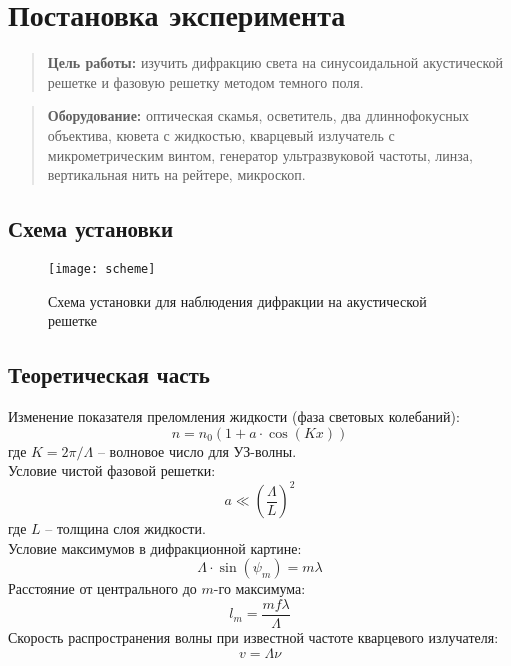 \documentclass{lab}
\begin{document}

\section*{Постановка эксперимента}

\begin{quote}
	\textbf{{\normalsize Цель работы: }}
	изучить дифракцию света на синусоидальной акустической
	решетке и фазовую решетку методом темного поля.
\end{quote}

\begin{quote}
	\textbf{{\normalsize Оборудование: }}
	оптическая скамья, осветитель, два
	длиннофокусных объектива, кювета с жидкостью, кварцевый излучатель с
	микрометрическим винтом, генератор ультразвуковой частоты, линза,
	вертикальная нить на рейтере, микроскоп.
\end{quote}

\subsection*{Схема установки}

\begin{figure}[H]
	\centering
	\texttt{[image: scheme]}
	\caption{Схема установки для наблюдения дифракции на акустической решетке}
	\label{scheme}
\end{figure}

\subsection*{Теоретическая часть}

Изменение показателя преломления жидкости (фаза световых колебаний):
\begin{equation}
n = n_0 (1 + a \cdot \cos (Kx))
\end{equation}
где $ K = 2 \pi / \Lambda $ -- волновое число для УЗ-волны.\\
Условие чистой фазовой решетки:
\begin{equation}
a \ll \left( \frac{\Lambda}{L} \right)^2
\end{equation}
где $ L $ -- толщина слоя жидкости.\\
Условие максимумов в дифракционной картине:
\begin{equation}
\Lambda \cdot \sin (\psi_m) = m \lambda
\end{equation}
Расстояние от центрального до $ m $-го максимума:
\begin{equation}
l_m = \frac{m f \lambda}{\Lambda}
\end{equation}
Скорость распространения волны при известной частоте кварцевого излучателя:
\begin{equation}
v = \Lambda \nu
\end{equation}
\end{document}
